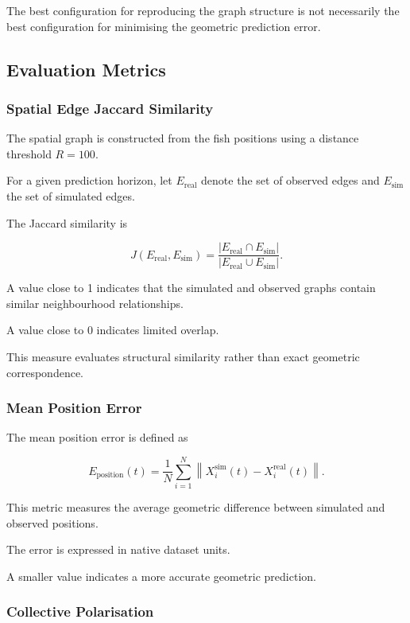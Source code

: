 \documentclass[10pt,a4paper]{article}
\begin{document}
The best configuration for reproducing
the graph structure is not necessarily
the best configuration for minimising
the geometric prediction error.

\subsection{Evaluation Metrics}

\subsubsection{Spatial Edge Jaccard Similarity}

The spatial graph is constructed
from the fish positions using
a distance threshold $R=100$.

For a given prediction horizon,
let $E_{\mathrm{real}}$
denote the set of observed edges
and $E_{\mathrm{sim}}$
the set of simulated edges.

The Jaccard similarity is

\[
J(E_{\mathrm{real}},E_{\mathrm{sim}})
=
\frac{
|E_{\mathrm{real}}\cap E_{\mathrm{sim}}|
}{
|E_{\mathrm{real}}\cup E_{\mathrm{sim}}|
}.
\]

A value close to 1 indicates
that the simulated and observed
graphs contain similar
neighbourhood relationships.

A value close to 0 indicates
limited overlap.

This measure evaluates structural
similarity rather than exact
geometric correspondence.

\subsubsection{Mean Position Error}

The mean position error is defined as

\[
E_{\mathrm{position}}(t)
=
\frac{1}{N}
\sum_{i=1}^{N}
\left\|
X_i^{\mathrm{sim}}(t)
-
X_i^{\mathrm{real}}(t)
\right\|.
\]

This metric measures the average
geometric difference between
simulated and observed positions.

The error is expressed in native
dataset units.

A smaller value indicates
a more accurate geometric prediction.

\subsubsection{Collective Polarisation}
\end{document}
